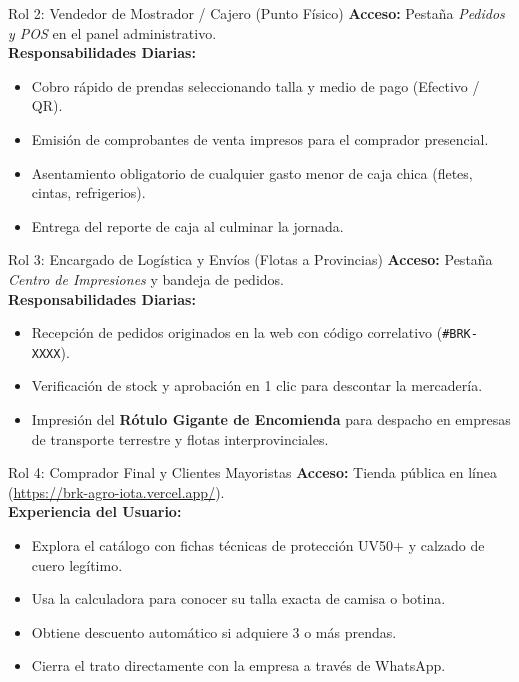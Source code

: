 \documentclass[11pt,a4paper]{article}
\begin{document}
\begin{rolebox}{Rol 2: Vendedor de Mostrador / Cajero (Punto Físico)}
\textbf{Acceso:} Pestaña \textit{Pedidos y POS} en el panel administrativo.\\
\textbf{Responsabilidades Diarias:}
\begin{itemize}
    \item Cobro rápido de prendas seleccionando talla y medio de pago (Efectivo / QR).
    \item Emisión de comprobantes de venta impresos para el comprador presencial.
    \item Asentamiento obligatorio de cualquier gasto menor de caja chica (fletes, cintas, refrigerios).
    \item Entrega del reporte de caja al culminar la jornada.
\end{itemize}
\end{rolebox}

\begin{rolebox}{Rol 3: Encargado de Logística y Envíos (Flotas a Provincias)}
\textbf{Acceso:} Pestaña \textit{Centro de Impresiones} y bandeja de pedidos.\\
\textbf{Responsabilidades Diarias:}
\begin{itemize}
    \item Recepción de pedidos originados en la web con código correlativo (\texttt{\#BRK-XXXX}).
    \item Verificación de stock y aprobación en 1 clic para descontar la mercadería.
    \item Impresión del \textbf{Rótulo Gigante de Encomienda} para despacho en empresas de transporte terrestre y flotas interprovinciales.
\end{itemize}
\end{rolebox}

\begin{rolebox}{Rol 4: Comprador Final y Clientes Mayoristas}
\textbf{Acceso:} Tienda pública en línea (\url{https://brk-agro-iota.vercel.app/}).\\
\textbf{Experiencia del Usuario:}
\begin{itemize}
    \item Explora el catálogo con fichas técnicas de protección UV50+ y calzado de cuero legítimo.
    \item Usa la calculadora para conocer su talla exacta de camisa o botina.
    \item Obtiene descuento automático si adquiere 3 o más prendas.
    \item Cierra el trato directamente con la empresa a través de WhatsApp.
\end{itemize}
\end{rolebox}
\end{document}
